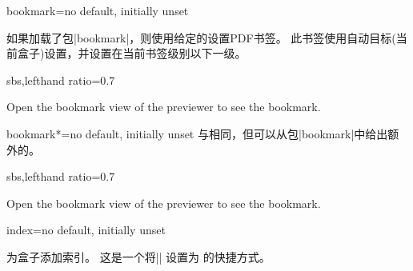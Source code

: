   \begin{docTcbKey}[][doc new=2017-02-10]{bookmark}{=}{no default, initially unset}
    
  如果加载了包|bookmark|，则使用给定的设置PDF书签。%
  此书签使用自动目标(当前盒子)设置，并设置在当前书签级别以下一级。%
    \begin{dispExample*}{sbs,lefthand ratio=0.7}
  \begin{tcolorbox}[colback=blue!10,colframe=blue!50!black,
    bookmark=Example for using a bookmark,
    title=Example for using a bookmark]
  Open the bookmark view of the previewer
  to see the bookmark.
  \end{tcolorbox}
    \end{dispExample*}
  \end{docTcbKey}
  
  
  \begin{docTcbKey}[][doc new=2017-02-10]{bookmark*}{=}{no default, initially unset}
    与相同，但可以从包|bookmark|中给出额外的。
    \begin{dispExample*}{sbs,lefthand ratio=0.7}
  \begin{tcolorbox}[colback=red!10,colframe=red!50!black,
    bookmark*={color=red,italic,bold}%
              {Another bookmark example},
    title=Red and bold bookmark]
  Open the bookmark view of the previewer
  to see the bookmark.
  \end{tcolorbox}
    \end{dispExample*}
  \end{docTcbKey}

  \begin{docTcbKey}[][doc new=2018-07-26]{index}{=}{no default, initially unset}
  
  为盒子添加索引。 这是一个将|\index| 设置为 的快捷方式。
  \end{docTcbKey}
  
